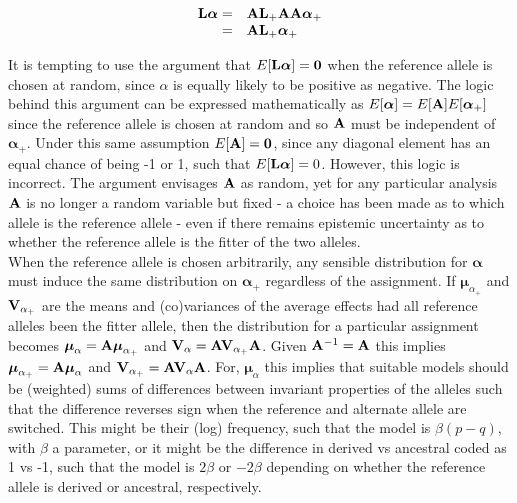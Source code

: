 \documentclass[12pt]{article}
\begin{document}
\begin{bibunit}
\begin{equation}
\begin{array}{rl}
{\bf L}\boldsymbol{\alpha} =& {\bf A}{\bf L}_{+}{\bf A}{\bf A}\boldsymbol{\alpha}_{+}\\
    =& {\bf A}{\bf L}_{+}\boldsymbol{\alpha}_{+}\\
\end{array}
\label{Eq:Lalpha}
\end{equation}

It is tempting to use the argument that $E[{\bf L}\boldsymbol{\alpha}]={\bf 0}$ when the reference allele is chosen at random, since $\alpha$ is equally likely to be positive as negative. The logic behind this argument can be expressed mathematically as $E[\boldsymbol{\alpha}]=E[{\bf A}]E[\boldsymbol{\alpha}_{+}]$ since the reference allele is chosen at random and so ${\bf A}$ must be independent of $\boldsymbol{\alpha}_{+}$. Under this same assumption $E[{\bf A}]={\bf 0}$, since any diagonal element has an equal chance of being -1 or 1, such that $E[{\bf L}\boldsymbol{\alpha}]=0$. However, this logic is incorrect. The argument envisages ${\bf A}$ as random, yet for any particular analysis ${\bf A}$ is no longer a random variable but fixed - a choice has been made as to which allele is the reference allele - even if there remains epistemic uncertainty as to whether the reference allele is the fitter of the two alleles.\\

 When the reference allele is chosen arbitrarily, any sensible distribution for $\boldsymbol{\alpha}$ must induce the same distribution on $\boldsymbol{\alpha}_{+}$ regardless of the assignment. If ${\boldsymbol \mu}_{{\alpha}_{+}}$ and ${\bf V}_{{\alpha}_{+}}$ are the means and (co)variances of the average effects had all reference alleles been the fitter allele, then the distribution for a particular assignment becomes ${\boldsymbol \mu}_{{\alpha}}={\bf A}{\boldsymbol \mu}_{{\alpha}_{+}}$ and ${\bf V}_{{\alpha}} = {\bf A}{\bf V}_{{\alpha}_{+}}{\bf A}$. Given ${\bf A}^{-1}={\bf A}$ this implies  ${\boldsymbol \mu}_{{\alpha}_{+}}={\bf A}{\boldsymbol \mu}_{{\alpha}}$ and ${\bf V}_{{\alpha}_{+}}={\bf A}{\bf V}_{{\alpha}}{\bf A}$. For, ${\boldsymbol \mu}_{\alpha}$ this implies that suitable models should be (weighted) sums of differences between invariant properties of the alleles such that the difference reverses sign when the reference and alternate allele are switched. This might be their (log) frequency, such that the model is $\beta(p-q)$, with $\beta$ a parameter, or it might be the difference in derived vs ancestral coded as 1 vs -1, such that the model is $2\beta$ or $-2\beta$ depending on whether the reference allele is derived or ancestral, respectively. 


\end{bibunit}
\end{document}
